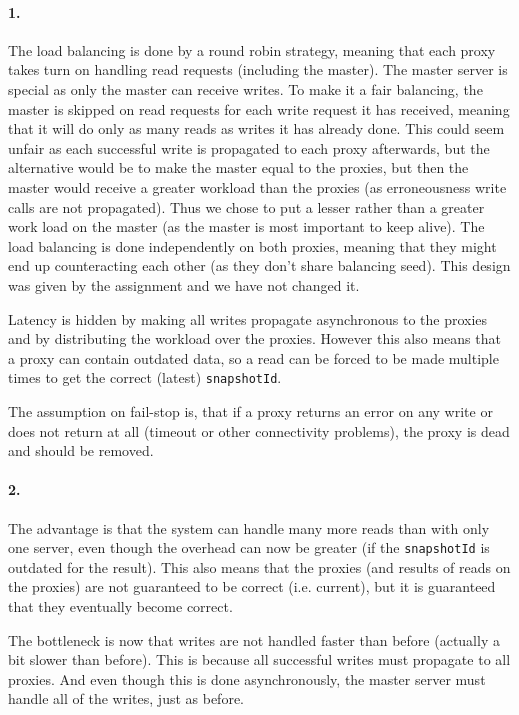 \documentclass[a4paper, 11pt]{article}
\begin{document}
\paragraph{1.}
The load balancing is done by a round robin strategy, meaning that each proxy takes turn on handling read requests (including the master). The master server is special as only the master can receive writes. To make it a fair balancing, the master is skipped on read requests for each write request it has received, meaning that it will do only as many reads as writes it has already done. This could seem unfair as each successful write is propagated to each proxy afterwards, but the alternative would be to make the master equal to the proxies, but then the master would receive a greater workload than the proxies (as erroneousness write calls are not propagated). Thus we chose to put a lesser rather than a greater work load on the master (as the master is most important to keep alive).
The load balancing is done independently on both proxies, meaning that they might end up counteracting each other (as they don't share balancing seed). This design was given by the assignment and we have not changed it.

Latency is hidden by making all writes propagate asynchronous to the proxies and by distributing the workload over the proxies. However this also means that a proxy can contain outdated data, so a read can be forced to be made multiple times to get the correct (latest) \texttt{snapshotId}.

The assumption on fail-stop is, that if a proxy returns an error on any write or does not return at all (timeout or other connectivity problems), the proxy is dead and should be removed.

\paragraph{2.}
The advantage is that the system can handle many more reads than with only one server, even though the overhead can now be greater (if the \texttt{snapshotId} is outdated for the result). This also means that the proxies (and results of reads on the proxies) are not guaranteed to be correct (i.e. current), but it is guaranteed that they eventually become correct.

The bottleneck is now that writes are not handled faster than before (actually a bit slower than before). This is because all successful writes must propagate to all proxies. And even though this is done asynchronously, the master server must handle all of the writes, just as before. 
\end{document}
